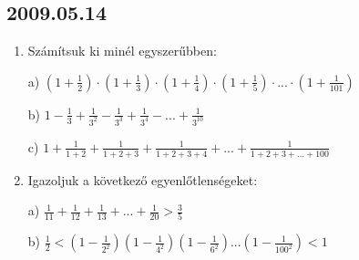 \documentclass{article}
\begin{document}
\subsection*{2009.05.14}
 
\begin{enumerate}
 
\item Számítsuk ki minél egyszerűbben:
 
a) $(1+\displaystyle{\frac{1}{2}})\cdot(1+\displaystyle{\frac{1}{3}})\cdot(1+\displaystyle{\frac{1}{4}})\cdot(1+\displaystyle{\frac{1}{5}})\cdot...\cdot (1+\displaystyle{\frac{1}{101}})$
 
b) $1-\displaystyle{\frac{1}{3}}+\displaystyle{\frac{1}{3^2}}-\displaystyle{\frac{1}{3^3}}+\displaystyle{\frac{1}{3^4}}-...+\displaystyle{\frac{1}{3^{10}}}$
 
c) $1+\displaystyle{\frac{1}{1+2}}+\displaystyle{\frac{1}{1+2+3}}+\displaystyle{\frac{1}{1+2+3+4}}+...+\displaystyle{\frac{1}{1+2+3+...+100}}$
 
\item Igazoljuk a következő egyenlőtlenségeket:
 
a) $\displaystyle{\frac{1}{11}}+\displaystyle{\frac{1}{12}}+\displaystyle{\frac{1}{13}}+...+\displaystyle{\frac{1}{20}}>\displaystyle{\frac{3}{5}}$
 
b) $\displaystyle{\frac{1}{2}}<(1-\displaystyle{\frac{1}{2^2}})(1-\displaystyle{\frac{1}{4^2}})(1-\displaystyle{\frac{1}{6^2}})...(1-\displaystyle{\frac{1}{100^2}})<1$
 
 
\end{enumerate}
 
\end{document}
